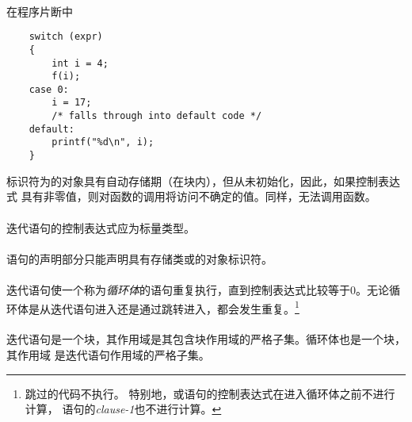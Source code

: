 {\paragraph{}
\ex* 在程序片断中
\begin{lstlisting}
    switch (expr)
    {
        int i = 4;
        f(i);
    case 0:
        i = 17;
        /* falls through into default code */
    default:
        printf("%d\n", i);
    }
\end{lstlisting}
标识符为的对象具有自动存储期（在块内），但从未初始化，因此，如果控制表达式
具有非零值，则对函数的调用将访问不确定的值。同样，无法调用函数。

\syntax
\paragraph{}

\constraint
\paragraph{}
迭代语句的控制表达式应为标量类型。

\paragraph{}
语句的声明部分只能声明具有存储类或的对象标识符。

\semantic
\paragraph{}
迭代语句使一个称为\textit{循环体}的语句重复执行，直到控制表达式比较等于0。无论循
环体是从迭代语句进入还是通过跳转进入，都会发生重复。\footnote{跳过的代码不执行。
特别地，或语句的控制表达式在进入循环体之前不进行计算，
语句的\textit{clause-1}也不进行计算。}

\paragraph{}
迭代语句是一个块，其作用域是其包含块作用域的严格子集。循环体也是一个块，其作用域
是迭代语句作用域的严格子集。

}
